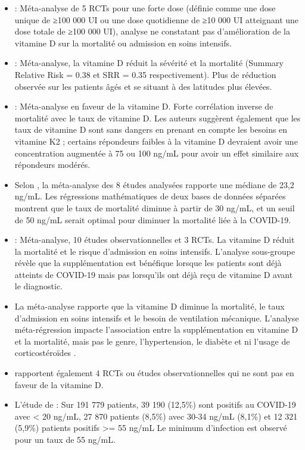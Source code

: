 \documentclass[
  a4paper,
  DIV=11,
  numbers=noendperiod,
  listof=totoc]{scrreprt}
\begin{document}
\begin{itemize}
\item
  \textcite{Zhong.2024}: Méta-analyse de 5 RCTs pour une forte dose
  (définie comme une dose unique de ≥100 000 UI ou une dose quotidienne
  de ≥10 000 UI atteignant une dose totale de ≥100 000 UI), analyse ne
  constatant pas d'amélioration de la vitamine D sur la mortalité ou
  admission en soins intensifs.
\item
  \textcite{Ghelani.2021} : Méta-analyse, la vitamine D réduit la
  sévérité et la mortalité (Summary Relative Risk = 0.38 et SRR = 0.35
  respectivement). Plus de réduction observée sur les patients âgés et
  se situant à des latitudes plus élevées.
\item
  \textcite{Borsche.2021}: Méta-analyse en faveur de la vitamine D.
  Forte corrélation inverse de mortalité avec le taux de vitamine D. Les
  auteurs suggèrent également que les taux de vitamine D sont sans
  dangers en prenant en compte les besoins en vitamine K2 ; certains
  répondeurs faibles à la vitamine D devraient avoir une concentration
  augmentée à 75 ou 100 ng/mL pour avoir un effet similaire aux
  répondeurs modérés.
\item
  Selon \textcite{Borsche.2021}, la méta-analyse des 8 études analysées
  rapporte une médiane de 23,2 ng/mL. Les régressions mathématiques de
  deux bases de données séparées montrent que le taux de mortalité
  diminue à partir de 30 ng/mL, et un seuil de 50 ng/mL serait optimal
  pour diminuer la mortalité liée à la COVID-19.
\item
  \textcite{Pal.2022}: Méta-analyse, 10 études observationnelles et 3
  RCTs. La vitamine D réduit la mortalité et le risque d'admission en
  soins intensifs. L'analyse sous-groupe révèle que la supplémentation
  est bénéfique lorsque les patients sont déjà atteints de COVID-19 mais
  pas lorsqu'ils ont déjà reçu de vitamine D avant le diagnostic.
\item
  La méta-analyse rapporte que la vitamine D diminue la mortalité, le
  taux d'admission en soins intensifs et le besoin de ventilation
  mécanique. L'analyse méta-régression impacte l'association entre la
  supplémentation en vitamine D et la mortalité, mais pas le genre,
  l'hypertension, le diabète et ni l'usage de corticostéroïdes
  \autocite{Hariyanto.2022}.
\item
  \textcite{Pal.2022} rapportent également 4 RCTs ou études
  observationnelles qui ne sont pas en faveur de la vitamine D.
\item
  L'étude de \textcite{Kaufman.2020} : Sur 191 779 patients, 39 190
  (12,5\%) sont positifs au COVID-19 avec \textless{} 20 ng/mL, 27 870
  patients (8,5\%) avec 30-34 ng/mL (8,1\%) et 12 321 (5,9\%) patients
  positifs \textgreater= 55 ng/mL Le minimum d'infection est observé
  pour un taux de 55 ng/mL.
\end{itemize}
\end{document}
